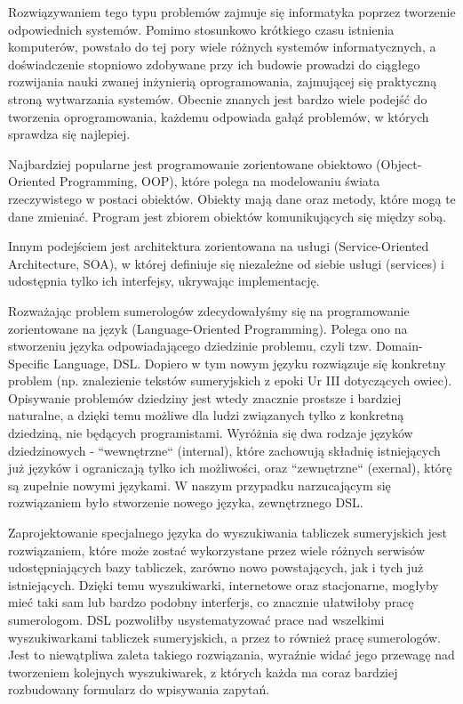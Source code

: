 Rozwiązywaniem tego typu problemów zajmuje się informatyka poprzez tworzenie odpowiednich systemów. Pomimo stosunkowo krótkiego czasu istnienia komputerów, powstało do tej pory wiele różnych systemów informatycznych, a doświadczenie stopniowo zdobywane przy ich budowie prowadzi do ciągłego rozwijania nauki zwanej inżynierią oprogramowania, zajmującej się praktyczną stroną wytwarzania systemów. Obecnie znanych jest bardzo wiele podejść do tworzenia oprogramowania, każdemu odpowiada gałąź problemów, w których sprawdza się najlepiej. 

Najbardziej popularne jest programowanie zorientowane obiektowo (Object-Oriented Programming, OOP), które polega na modelowaniu świata rzeczywistego w postaci obiektów. Obiekty mają dane oraz metody, które mogą te dane zmieniać. Program jest zbiorem obiektów komunikujących się między sobą. 

Innym podejściem jest architektura zorientowana na usługi (Service-Oriented Architecture, SOA), w której definiuje się niezależne od siebie usługi (services) i udostępnia tylko ich interfejsy, ukrywając implementację.

Rozważając problem sumerologów zdecydowałyśmy się na programowanie zorientowane na język (Language-Oriented Programming). Polega ono na stworzeniu języka odpowiadającego dziedzinie problemu, czyli tzw. Domain-Specific Language, DSL. Dopiero w tym nowym języku rozwiązuje się konkretny problem (np. znalezienie tekstów sumeryjskich z epoki Ur III dotyczących owiec). Opisywanie problemów dziedziny jest wtedy znacznie prostsze i bardziej naturalne, a dzięki temu możliwe dla ludzi związanych tylko z konkretną dziedziną, nie będących programistami. 
Wyróżnia się dwa rodzaje języków dziedzinowych - ``wewnętrzne`` (internal), które zachowują składnię istniejących już języków i ograniczają tylko ich możliwości, oraz ``zewnętrzne`` (exernal), którę są zupełnie nowymi językami. W naszym przypadku narzucającym się rozwiązaniem było stworzenie nowego języka, zewnętrznego DSL. 

Zaprojektowanie specjalnego języka do wyszukiwania tabliczek sumeryjskich jest rozwiązaniem, które może zostać wykorzystane przez wiele różnych serwisów udostępniających bazy tabliczek, zarówno nowo powstających, jak i tych już istniejących. Dzięki temu wyszukiwarki, internetowe oraz stacjonarne, mogłyby mieć taki sam lub bardzo podobny interferjs, co znacznie ułatwiłoby pracę sumerologom. DSL pozwoliłby usystematyzować prace nad wszelkimi wyszukiwarkami tabliczek sumeryjskich, a przez to również pracę sumerologów. Jest to niewątpliwa zaleta takiego rozwiązania, wyraźnie widać jego przewagę nad tworzeniem kolejnych wyszukiwarek, z których każda ma coraz bardziej rozbudowany formularz do wpisywania zapytań.

